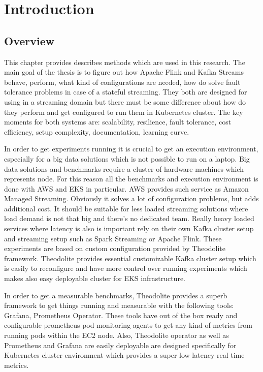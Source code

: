 \section{Introduction}\label{sec:introduction}


\subsection{Overview}\label{sec:overview}
This chapter provides describes methods which are used in this research.
The main goal of the thesis is to figure out how Apache Flink and Kafka Streams
behave, perform, what kind of configurations are needed, how do solve fault tolerance problems
in case of a stateful streaming.
They both are designed for using in a streaming domain but there must be some difference
about how do they perform and get configured to run them in Kubernetes cluster.
The key moments for both systems are: scalability, resilience, fault tolerance, cost efficiency,
setup complexity, documentation, learning curve.

In order to get experiments running it is crucial to get an execution environment, especially
for a big data solutions which is not possible to run on a laptop.
Big data solutions and benchmarks require a cluster of hardware machines which represents node.
For this reason all the benchmarks and execution environment is done with AWS and EKS in
particular.
AWS provides such service as Amazon Managed Streaming.
Obviously it solves a lot of configuration problems, but adds additional cost.
It should be suitable for less loaded streaming solutions where load demand is not that big
and there's no dedicated team.
Really heavy loaded services where latency is also is important rely on their own
Kafka cluster setup and streaming setup such as Spark Streaming or Apache Flink.
These experiments are based on custom configuration provided by Theodolite framework.
Theodolite provides essential customizable Kafka cluster setup which is easily to reconfigure
and have more control over running experiments which makes also easy deployable cluster
for EKS infrastructure.

In order to get a measurable benchmarks, Theodolite provides a superb framework to get
things running and measurable with the following tools: Grafana, Prometheus Operator.
These tools have out of the box ready and configurable prometheus pod monitoring agents
to get any kind of metrics from running pods within the EC2 node.
Also, Theodolite operator as well as Prometheus and Grafana are easily deployable
are designed specifically for Kubernetes cluster environment which provides a super low latency
real time metrics.

